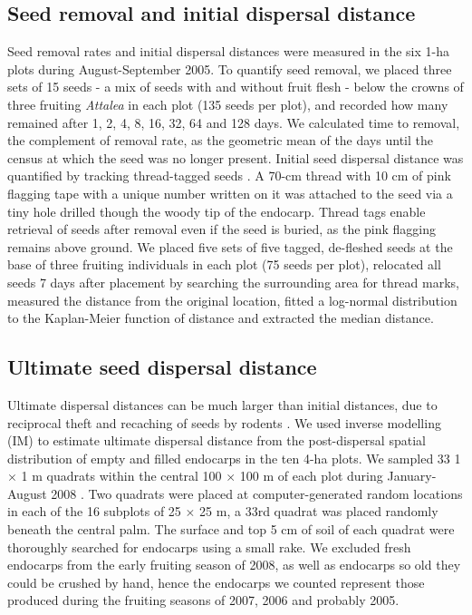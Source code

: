 \documentclass[b5paper,justified]{tufte-book} %
\begin{document}
\begin{fullwidth}
\subsection{Seed removal and initial dispersal distance}
Seed removal rates and initial dispersal distances were measured in the six 1-ha plots during August-September 2005. To quantify seed removal, we placed three sets of 15 seeds - a mix of seeds with and without fruit flesh - below the crowns of three fruiting \textit{Attalea} in each plot (135 seeds per plot), and recorded how many remained after 1, 2, 4, 8, 16, 32, 64 and 128 days. We calculated time to removal, the complement of removal rate, as the geometric mean of the days until the census at which the seed was no longer present. Initial seed dispersal distance was quantified by tracking thread-tagged seeds \citep{Forget2005}. A 70-cm thread with 10 cm of pink flagging tape with a unique number written on it was attached to the seed via a tiny hole drilled though the woody tip of the endocarp. Thread tags enable retrieval of seeds after removal even if the seed is buried, as the pink flagging remains above
ground. We placed five sets of five tagged, de-fleshed seeds at the base of three fruiting individuals in each plot (75 seeds per plot), relocated all seeds 7 days after placement by searching the surrounding area for thread marks, measured the distance from the original location, fitted a log-normal distribution to the Kaplan-Meier function of distance \citep[after]{Jansen2004, Hirsch2012} and extracted the median distance.

\subsection{Ultimate seed dispersal distance}
Ultimate dispersal distances can be much larger than initial distances, due to reciprocal theft and recaching of seeds by rodents \citep{Jansen2012}. We used inverse modelling (IM) to estimate ultimate dispersal distance from the post-dispersal spatial distribution of empty and filled endocarps in the ten 4-ha plots. We sampled 33 1 $\times$ 1 m quadrats within the central 100 $\times$ 100 m of each plot during January-August 2008 \citep[see][chapter 2]{Visser2011a}. Two quadrats were placed at computer-generated random locations in each of the 16 subplots of 25 $\times$ 25 m, a 33rd quadrat was placed randomly beneath the central palm. The surface and top 5 cm of soil of each quadrat were thoroughly searched for endocarps using a small rake. We excluded fresh endocarps from the early fruiting season of 2008, as well as endocarps so old they could be crushed by hand, hence the endocarps we counted represent those produced during the fruiting seasons of 2007, 2006 and probably 2005.


\end{fullwidth}
\end{document}
